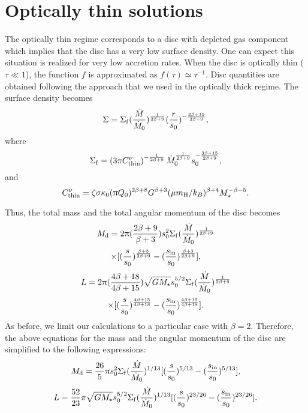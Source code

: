 \documentclass[apj]{emulateapj}
\begin{document}
\section{Optically thin solutions}
%
%
The optically thin regime corresponds to a disc with depleted gas component which implies that the disc has a very low surface density. One can expect this situation is realized for very low accretion rates. When the disc is optically thin ($\tau\ll 1$), the function $f$ is approximated as $f(\tau)\simeq \tau^{-1}$. Disc quantities are obtained following the approach that we used in the optically thick regime. The surface density becomes 
%
%
\begin{equation}
\Sigma = \Sigma_{\rm f} (\frac{\dot{M}}{\dot{M}_0})^{\frac{1}{2\beta +9}} (\frac{r}{s_0})^{-\frac{3\beta +15}{2\beta +9}} ,
\end{equation}
%
where
%
\begin{equation}
\Sigma_{\rm f} = \left(3\pi C_{\rm thin}^{\nu} \right)^{-\frac{1}{2\beta +9}} \dot{M}_{0}^{\frac{1}{2\beta +9}} s_{0}^{-\frac{3\beta +15}{2\beta +9}},
\end{equation}
%
and
%
\begin{equation}
C_{\rm thin}^\nu = \zeta \sigma \kappa_0 (\uppi Q_0 )^{2\beta+8} G^{\beta + 3} (\mu m_{\rm H} /k_{B})^{\beta +4} M_{\star}^{-\beta - 5}.
\end{equation}
%

Thus, the total mass and the total angular momentum of the disc becomes
%
\begin{displaymath}
M_{\rm d} =2\uppi (\frac{2\beta +9}{\beta +3}) s_{0}^{2} \Sigma_{\rm f} (\frac{\dot{M}}{\dot{M}_{0}})^{\frac{1}{2\beta +9}}
\end{displaymath}
%
\begin{equation}
\times [(\frac{s}{s_0})^{\frac{\beta +3}{2\beta +9}} - (\frac{s_{\rm in}}{s_0})^{\frac{\beta +3}{2\beta +9}} ], 
\end{equation}
%
%
\begin{displaymath}
L =2\uppi (\frac{4\beta +18}{4\beta +15})\sqrt{GM_{\star}} s_{0}^{5/2} \Sigma_{\rm f} (\frac{\dot{M}}{\dot{M}_{0}})^{\frac{1}{2\beta +9}}
\end{displaymath}
%
\begin{equation}
\times [(\frac{s}{s_0})^{\frac{4\beta +15}{4\beta +18}} - (\frac{s_{\rm in}}{s_0})^{\frac{4\beta +15}{4\beta +18}} ].
\end{equation}
%
As before, we limit our calculations to a particular case with $\beta =2$. Therefore, the above equations for the mass and the angular momentum of the disc are simplified to the following expressions:
%
%
%
%
\begin{equation}
M_{\rm d} =\frac{26}{5}\uppi  s_{0}^{2} \Sigma_{\rm f} (\frac{\dot{M}}{\dot{M}_{0}})^{1/13} [(\frac{s}{s_0})^{5/13} - (\frac{s_{\rm in}}{s_0})^{5/13} ] ,
\end{equation}
%
\begin{equation}
L =\frac{52}{23}\pi \sqrt{GM_{\star}} s_{0}^{5/2} \Sigma_{\rm f} (\frac{\dot{M}}{\dot{M}_{0}})^{1/13} [(\frac{s}{s_0})^{23/26} - (\frac{s_{\rm in}}{s_0})^{23/26} ] .
\end{equation}
%
%
\end{document}
